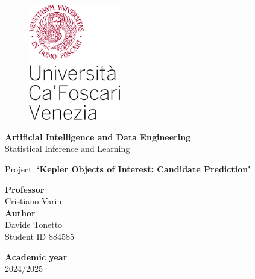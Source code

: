 \begin{titlepage}
\begin{figure}[!htb]
    \includegraphics[width=4cm]{Immagini/logo 2 unive.png}
\end{figure}

\begin{center}
    \vspace{13mm}
    \normalsize{\textbf{Artificial Intelligence and Data Engineering}}
    \vspace{13mm}
    \\ \normalsize{Statistical Inference and Learning}
\end{center}

\vspace{10mm}
\begin{center}
    \LARGE{Project: \textbf{`Kepler Objects of Interest: Candidate Prediction'}}
\end{center}

\vspace*{\fill}

\begin{minipage}[t]{1\textwidth}
    {\normalsize{\textbf{Professor}}{\normalsize\vspace{1mm}
    \\ \normalsize{Cristiano Varin }}} \\ 
        
    {\normalsize{\textbf{Author}}{\normalsize\vspace{1mm}
    \\ \normalsize{Davide Tonetto}\\
    \normalsize{Student ID 884585 }}} \\
\end{minipage}

\begin{flushleft}
    {\normalsize{\textbf{Academic year}}{\normalsize\vspace{1mm}
    \\ \normalsize{2024/2025}}}  
\end{flushleft}

\end{titlepage}
